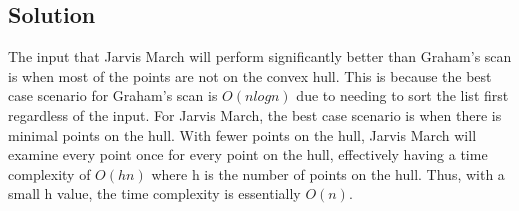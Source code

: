 \subsection*{Solution}

The input that Jarvis March will perform significantly better than Graham's scan is when most of the points are not on the convex hull. This is because the best case scenario for Graham's scan is $O(nlog n)$ due to needing to sort the list first regardless of the input. For Jarvis March, the best case scenario is when there is minimal points on the hull. With fewer points on the hull, Jarvis March will examine every point once for every point on the hull, effectively having a time complexity of $O(hn)$ where h is the number of points on the hull. Thus, with a small h value, the time complexity is essentially $O(n)$.
